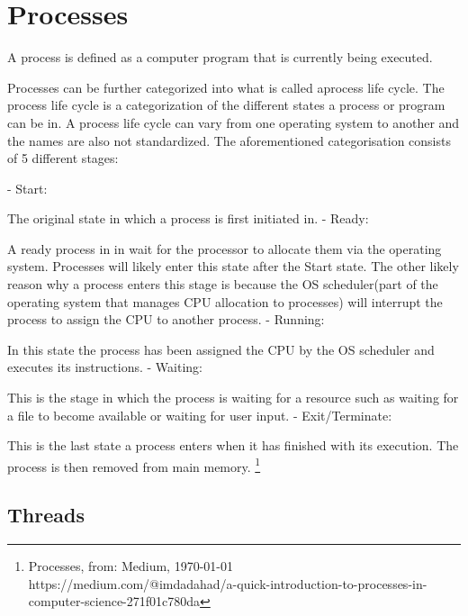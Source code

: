 \section{Processes}

A process is defined as a computer program that is currently being executed. 

Processes can be further categorized into what is called aprocess life cycle. The process life cycle is
a categorization of the different states a process or program can be in. A process life cycle can vary
from one operating system to another and the names are also not standardized. The aforementioned 
categorisation consists of 5 different stages:

- Start:

The original state in which a process is first initiated in.
- Ready:

A ready process in in wait for the processor to allocate them via the operating system. Processes will
likely enter this state after the Start state. The other likely reason why a process enters this stage
is because the OS scheduler(part of the operating system that manages CPU allocation to processes) will
interrupt the process to assign the CPU to another process.
- Running:

In this state the process has been assigned the CPU by the OS scheduler and executes its instructions.
- Waiting:

This is the stage in which the process is waiting for a resource such as waiting for a file to become available
or waiting for user input.
- Exit/Terminate:

This is the last state a process enters when it has finished with its execution. The process is then removed
from main memory. \footnote{Processes, from: Medium, \today   \\ https://medium.com/@imdadahad/a-quick-introduction-to-processes-in-computer-science-271f01c780da}

\subsection{Threads}

